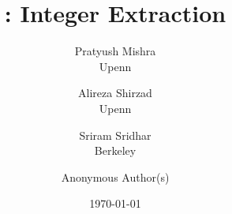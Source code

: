 








\title{\papername: Integer Extraction}
\iffull
  \author{
    Pratyush Mishra\\
    Upenn
    \and
    Alireza Shirzad\\
    Upenn
    \and
    Sriram Sridhar\\
    Berkeley
  }
\else
  \author{Anonymous Author(s)}
  \iflncs\institute{}\fi
\fi
\date{\today}


\maketitle


\appendix
% 

\doclearpage
\printbibliography


